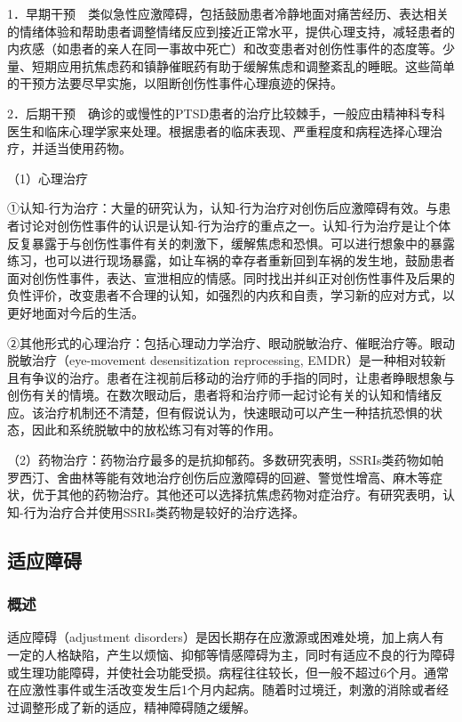 1．早期干预　类似急性应激障碍，包括鼓励患者冷静地面对痛苦经历、表达相关的情绪体验和帮助患者调整情绪反应到接近正常水平，提供心理支持，减轻患者的内疚感（如患者的亲人在同一事故中死亡）和改变患者对创伤性事件的态度等。少量、短期应用抗焦虑药和镇静催眠药有助于缓解焦虑和调整紊乱的睡眠。这些简单的干预方法要尽早实施，以阻断创伤性事件心理痕迹的保持。

2．后期干预　确诊的或慢性的PTSD患者的治疗比较棘手，一般应由精神科专科医生和临床心理学家来处理。根据患者的临床表现、严重程度和病程选择心理治疗，并适当使用药物。

（1）心理治疗

①认知-行为治疗：大量的研究认为，认知-行为治疗对创伤后应激障碍有效。与患者讨论对创伤性事件的认识是认知-行为治疗的重点之一。认知-行为治疗是让个体反复暴露于与创伤性事件有关的刺激下，缓解焦虑和恐惧。可以进行想象中的暴露练习，也可以进行现场暴露，如让车祸的幸存者重新回到车祸的发生地，鼓励患者面对创伤性事件，表达、宣泄相应的情感。同时找出并纠正对创伤性事件及后果的负性评价，改变患者不合理的认知，如强烈的内疚和自责，学习新的应对方式，以更好地面对今后的生活。

②其他形式的心理治疗：包括心理动力学治疗、眼动脱敏治疗、催眠治疗等。眼动脱敏治疗（eye-movement
desensitization reprocessing,
EMDR）是一种相对较新且有争议的治疗。患者在注视前后移动的治疗师的手指的同时，让患者睁眼想象与创伤有关的情境。在数次眼动后，患者将和治疗师一起讨论有关的认知和情绪反应。该治疗机制还不清楚，但有假说认为，快速眼动可以产生一种拮抗恐惧的状态，因此和系统脱敏中的放松练习有对等的作用。

（2）药物治疗：药物治疗最多的是抗抑郁药。多数研究表明，SSRIs类药物如帕罗西汀、舍曲林等能有效地治疗创伤后应激障碍的回避、警觉性增高、麻木等症状，优于其他的药物治疗。其他还可以选择抗焦虑药物对症治疗。有研究表明，认知-行为治疗合并使用SSRIs类药物是较好的治疗选择。

\subsection{适应障碍}

\subsubsection{概述}

适应障碍（adjustment
disorders）是因长期存在应激源或困难处境，加上病人有一定的人格缺陷，产生以烦恼、抑郁等情感障碍为主，同时有适应不良的行为障碍或生理功能障碍，并使社会功能受损。病程往往较长，但一般不超过6个月。通常在应激性事件或生活改变发生后1个月内起病。随着时过境迁，刺激的消除或者经过调整形成了新的适应，精神障碍随之缓解。

